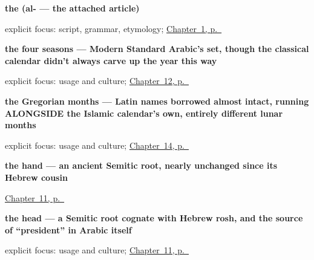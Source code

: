 \noindent\begin{minipage}[t]{\linewidth}
\raggedright
\textbf{the (al- — the attached article)}\enspace\emph{}\par
\footnotesize explicit focus: script, grammar, etymology; \hyperref[ch:greetings]{Chapter~1, p.~\pageref*{ch:greetings}}
\end{minipage}\par\smallskip

\noindent\begin{minipage}[t]{\linewidth}
\raggedright
\textbf{the four seasons — Modern Standard Arabic's set, though the classical calendar didn't always carve up the year this way}\enspace\emph{   }\par
\footnotesize explicit focus: usage and culture; \hyperref[ch:ar-seasons]{Chapter~12, p.~\pageref*{ch:ar-seasons}}
\end{minipage}\par\smallskip

\noindent\begin{minipage}[t]{\linewidth}
\raggedright
\textbf{the Gregorian months — Latin names borrowed almost intact, running ALONGSIDE the Islamic calendar's own, entirely different lunar months}\enspace\emph{           }\par
\footnotesize explicit focus: usage and culture; \hyperref[ch:ar-months]{Chapter~14, p.~\pageref*{ch:ar-months}}
\end{minipage}\par\smallskip

\noindent\begin{minipage}[t]{\linewidth}
\raggedright
\textbf{the hand — an ancient Semitic root, nearly unchanged since its Hebrew cousin}\enspace\emph{}\par
\footnotesize \hyperref[ch:ar-head-and-hand]{Chapter~11, p.~\pageref*{ch:ar-head-and-hand}}
\end{minipage}\par\smallskip

\noindent\begin{minipage}[t]{\linewidth}
\raggedright
\textbf{the head — a Semitic root cognate with Hebrew rosh, and the source of \textquotedblleft{}president\textquotedblright{} in Arabic itself}\enspace\emph{}\par
\footnotesize explicit focus: usage and culture; \hyperref[ch:ar-head-and-hand]{Chapter~11, p.~\pageref*{ch:ar-head-and-hand}}
\end{minipage}\par\smallskip

